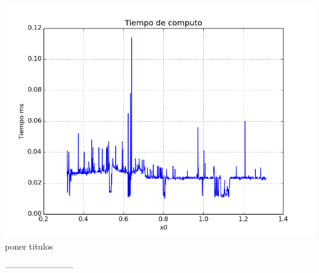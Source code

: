 \begin{center}
\includegraphics[scale=0.5]{graficos/tiempo-e-newton-alfa_fijo-absoluto-0.0001-alejando.png}\\
poner titulos
\end{center}
------------------------











